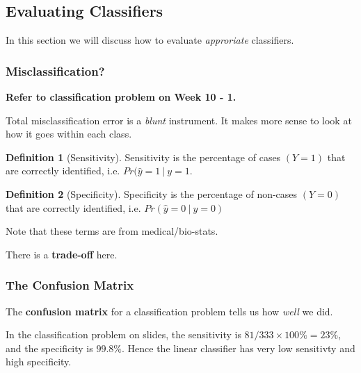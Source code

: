 \documentclass[11pt]{article}
\theoremstyle{definition}
\newtheorem{definition}{Definition}[section]
\numberwithin{equation}{section}
\begin{document}
\subsection{Evaluating Classifiers}

In this section we will discuss how to evaluate \textit{approriate} classifiers.

\subsubsection{Misclassification?}

\textbf{Refer to classification problem on Week 10 - 1.}

Total misclassification error is a \textit{blunt} instrument. It makes more sense to look at how it goes within each class.

\begin{definition}[Sensitivity]
  Sensitivity is the percentage of cases $(Y = 1)$ that are correctly identified, i.e. $Pr(\hat{y} = 1 \>|\> y = 1$.
\end{definition}

\begin{definition}[Specificity]
  Specificity is the percentage of non-cases $(Y = 0)$ that are correctly identified, i.e. $Pr(\hat{y} = 0\>|\> y = 0)$
\end{definition}

\begin{writenotes}
  Note that these terms are from medical/bio-stats.

  There is a \textbf{trade-off} here.
\end{writenotes}

\subsubsection{The Confusion Matrix}

The \textbf{confusion matrix} for a classification problem tells us how \textit{well} we did.

In the classification problem on slides, the sensitivity is $81/333\times 100\% = 23\%$, and the specificity is $99.8\%$. Hence the linear classifier has very low sensitivty and high specificity.
\end{document}
